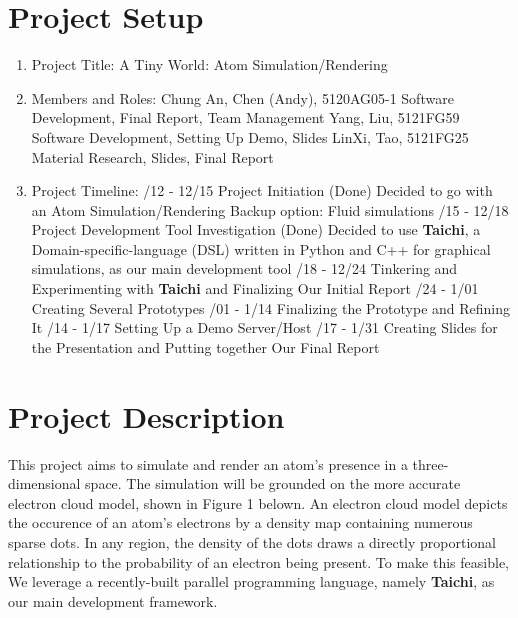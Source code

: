 \documentclass[10pt]{article}
\numberwithin{equation}{section}
\begin{document}
\section{Project Setup}
\begin{enumerate}
    \item Project Title: A Tiny World: Atom Simulation/Rendering
    \item Members and Roles:
        \subitem Chung An, Chen (Andy), 5120AG05-1
            \subsubitem Software Development, Final Report, Team Management
        \subitem Yang, Liu, 5121FG59
            \subsubitem Software Development, Setting Up Demo, Slides
        \subitem LinXi, Tao, 5121FG25
            \subsubitem Material Research, Slides, Final Report
    \item Project Timeline:
        /12 - 12/15 Project Initiation (Done)
            \subsubitem Decided to go with an Atom Simulation/Rendering
            \subsubitem Backup option: Fluid simulations
        /15 - 12/18 Project Development Tool Investigation (Done) 
            \subsubitem Decided to use \textbf{Taichi}, a Domain-specific-language (DSL) written in Python and C++ for graphical simulations, as our main development tool
        /18 - 12/24 Tinkering and Experimenting with \textbf{Taichi} and Finalizing Our Initial Report
        /24 - 1/01 Creating Several Prototypes
        /01 - 1/14 Finalizing the Prototype and Refining It
        /14 - 1/17 Setting Up a Demo Server/Host
        /17 - 1/31 Creating Slides for the Presentation and Putting together Our Final Report
\end{enumerate}
\section{Project Description}
    This project aims to simulate and render an atom's presence in a three-dimensional space. The simulation will be grounded on the more accurate electron cloud model, shown in Figure 1 belown. An electron cloud model depicts the occurence of an atom's electrons by a density map containing numerous sparse dots. In any region, the density of the dots draws a directly proportional relationship to the probability of an electron being present. To make this feasible, We leverage a recently-built parallel programming language, namely \textbf{Taichi}, as our main development framework.
\end{document}

